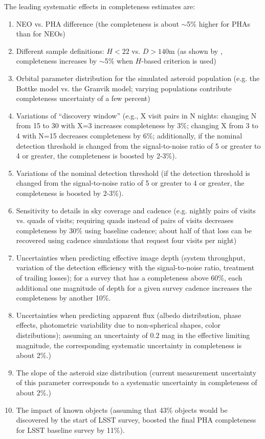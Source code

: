 \documentclass[12pt,preprint]{aastex}
\begin{document}
The leading systematic effects in completeness estimates are: 
\begin{enumerate}
\item NEO vs. PHA difference (the completeness is about $\sim$5\% higher for PHAs than for NEOs) 
\item Different sample definitions: $H<22$ vs. $D>140$m (as shown by \citep{GMS2016}, completeness
           increases by $\sim$5\% when $H$-based criterion is used) 
\item Orbital parameter distribution for the simulated asteroid population (e.g. the Bottke model
             vs. the Granvik model; varying populations contribute completeness uncertainty of a few percent) 
\item Variations of ``discovery window'' (e.g., X visit pairs in N nights: changing N from 15 to 30 with X=3 increases
          completeness by 3\%; changing X from 3 to 4 with N=15 decreases completeness by 6\%; 
          additionally, if the nominal detection threshold is changed from the signal-to-noise ratio of 5 or greater  
          to 4 or greater, the completeness is boosted by 2-3\%). 
\item Variations of the nominal detection threshold (if the detection threshold is changed from the 
          signal-to-noise ratio of 5 or greater to 4 or greater, the completeness is boosted by 2-3\%). 
\item Sensitivity to details in sky coverage and cadence (e.g. nightly pairs of visits vs. quads of visits;
          requiring quads instead of pairs of visits decreases completeness by 30\% using baseline cadence; 
          about half of that loss can be recovered using cadence simulations that request four visits per night) 
\item Uncertainties when predicting effective image depth (system throughput, variation of the detection efficiency
          with the signal-to-noise ratio, treatment of trailing losses); for a survey that has a completeness above 60\%, 
          each additional one magnitude of depth for a given survey cadence increases the completeness by another 10\%.
\item Uncertainties when predicting apparent flux (albedo distribution, phase effects, photometric variability 
          due to non-spherical shapes, color distributions); assuming an uncertainty of 0.2 mag in the effective 
          limiting magnitude, the corresponding  systematic uncertainty in completeness is about 2\%.)
\item The slope of the asteroid size distribution (current measurement uncertainty of this parameter 
          corresponds to a systematic uncertainty in completeness of about 2\%.)
\item The impact of known objects (assuming that 43\% objects would be discovered by the start of
          LSST survey, \citep{GMS2016} boosted the final PHA completeness for LSST baseline survey by 11\%). 
\end{enumerate} 
\end{document}
